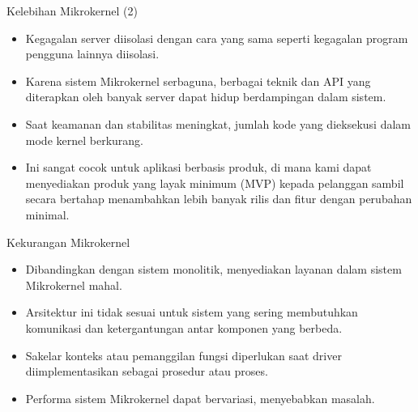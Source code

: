 \documentclass[aspectratio=169, table]{beamer}
\begin{document}
	\begin{frame}{Kelebihan Mikrokernel (2)}
	\begin{itemize}

			\item Kegagalan server diisolasi dengan cara yang sama seperti kegagalan program pengguna lainnya diisolasi.

		\item Karena sistem Mikrokernel serbaguna, berbagai teknik dan API yang diterapkan oleh banyak server dapat hidup berdampingan dalam sistem.

		\item Saat keamanan dan stabilitas meningkat, jumlah kode yang dieksekusi dalam mode kernel berkurang.

		\item Ini sangat cocok untuk aplikasi berbasis produk, di mana kami dapat menyediakan produk yang layak minimum (MVP) kepada pelanggan sambil secara bertahap menambahkan lebih banyak rilis dan fitur dengan perubahan minimal.

	\end{itemize}
\end{frame}

	\begin{frame}{Kekurangan Mikrokernel}

		\begin{itemize}
			\item Dibandingkan dengan sistem monolitik, menyediakan layanan dalam sistem Mikrokernel mahal.

			\item Arsitektur ini tidak sesuai untuk sistem yang sering membutuhkan komunikasi dan ketergantungan antar komponen yang berbeda.

			\item Sakelar konteks atau pemanggilan fungsi diperlukan saat driver diimplementasikan sebagai prosedur atau proses.

			\item Performa sistem Mikrokernel dapat bervariasi, menyebabkan masalah.
		\end{itemize}
	\end{frame}
\end{document}
